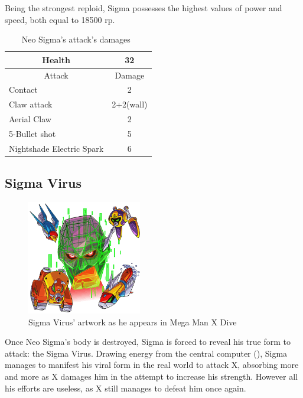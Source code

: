 Being the strongest reploid, Sigma possesses the highest values of power and speed, both equal to 18500 rp.
\begin{table}[htp]
	\centering
	\begin{tabular}[htp]{l c}
		\toprule
		\multicolumn{1}{c}{Health}  & 32 \\
		\midrule
		\multicolumn{1}{c}{Attack} & \multicolumn{1}{c}{Damage}\\
		Contact & 2 \\
		Claw attack & 2+2(wall)\\
		Aerial Claw& 2\\
		5-Bullet shot& 5\\
		Nightshade Electric Spark& 6\\
		\bottomrule
	\end{tabular}
	\caption{Neo Sigma's attack's damages~\cite{wiki:Neo_sigma}}
\end{table}
\subsection{Sigma Virus}\label{boss:Sigma_virus}
\begin{figure}[htp]
	\centering
	\includegraphics[height=5cm]{figures/X2/Hunter_stages/Sigma_Virus.png}
	\caption{Sigma Virus' artwork as he appears in Mega Man X Dive}
\end{figure}
Once Neo Sigma's body is destroyed, Sigma is forced to reveal his true form to attack: the Sigma Virus. Drawing energy from the central computer (\cite{wayback:X2_resources}), Sigma manages to manifest his viral form in the real world to attack X, absorbing more and more as X damages him in the attempt to increase his strength. However all his efforts are useless, as X still manages to defeat him once again.

